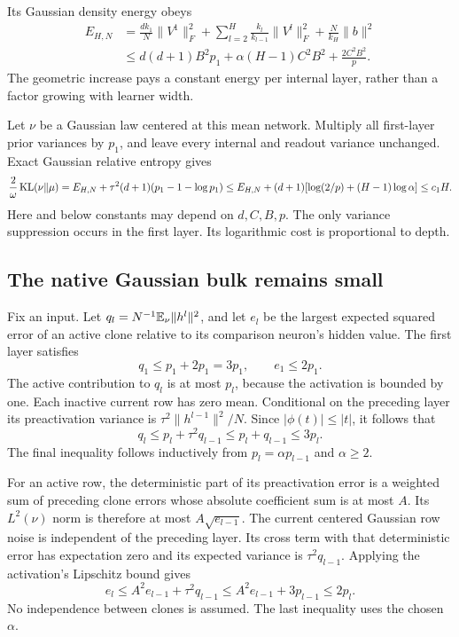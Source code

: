 Its Gaussian density energy obeys
\begin{align}
 E_{H,N}
 &=\frac{dk_1}{N}\|V^1\|_F^2
   +\sum_{l=2}^H\frac{k_l}{k_{l-1}}\|V^l\|_F^2
   +\frac N{k_H}\|b\|^2\\
 &\le d(d+1)B^2p_1+\alpha(H-1)C^2B^2
                        +\frac{2C^2B^2}p.
 \label{eq:geometric-mean-energy}
\end{align}
The geometric increase pays a constant energy per internal layer, rather than a factor growing with learner width.

Let $\nu$ be a Gaussian law centered at this mean network. Multiply all first-layer prior variances by $p_1$, and leave every internal and readout variance unchanged. Exact Gaussian relative entropy gives
\begin{equation}
 \frac2\omega\operatorname{KL}(\nu\Vert\mu)
 =E_{H,N}+\tau^2(d+1)(p_1-1-\log p_1)
 \le E_{H,N}+(d+1)[\log(2/p)+(H-1)\log\alpha]
 \le c_1H.
 \label{eq:geometric-kl}
\end{equation}
Here and below constants may depend on $d,C,B,p$. The only variance suppression occurs in the first layer. Its logarithmic cost is proportional to depth.

\subsection{The native Gaussian bulk remains small}
Fix an input. Let $q_l=N^{-1}\mathbb E_\nu\|h^l\|^2$, and let $e_l$ be the largest expected squared error of an active clone relative to its comparison neuron's hidden value. The first layer satisfies
\[
 q_1\le p_1+2p_1=3p_1,\qquad e_1\le2p_1.
\]
The active contribution to $q_l$ is at most $p_l$, because the activation is bounded by one. Each inactive current row has zero mean. Conditional on the preceding layer its preactivation variance is $\tau^2\|h^{l-1}\|^2/N$. Since $|\phi(t)|\le|t|$, it follows that
\[
 q_l\le p_l+\tau^2q_{l-1}\le p_l+q_{l-1}\le3p_l.
 \label{eq:geometric-q}
\]
The final inequality follows inductively from $p_l=\alpha p_{l-1}$ and $\alpha\ge2$.

For an active row, the deterministic part of its preactivation error is a weighted sum of preceding clone errors whose absolute coefficient sum is at most $A$. Its $L^2(\nu)$ norm is therefore at most $A\sqrt{e_{l-1}}$. The current centered Gaussian row noise is independent of the preceding layer. Its cross term with that deterministic error has expectation zero and its expected variance is $\tau^2q_{l-1}$. Applying the activation's Lipschitz bound gives
\[
 e_l\le A^2e_{l-1}+\tau^2q_{l-1}
     \le A^2e_{l-1}+3p_{l-1}\le2p_l.
 \label{eq:geometric-e}
\]
No independence between clones is assumed. The last inequality uses the chosen $\alpha$.

